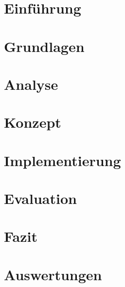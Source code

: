 \documentclass[twoside,bibliography=totoc,openany,numbers=noenddot]{fumi}
\begin{document}
\begin{sloppypar}
\chapter{Einführung}



\chapter{Grundlagen}



\chapter{Analyse}



\chapter{Konzept}



\chapter{Implementierung}




\chapter{Evaluation}



\chapter{Fazit}



\appendix

\chapter{Auswertungen}

\end{sloppypar}

\end{document}
